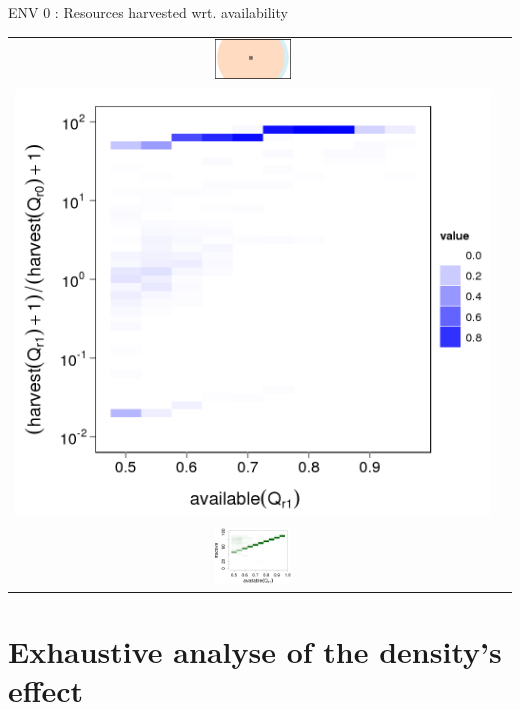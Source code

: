\documentclass[8pt, handout=show,notes=show]{beamer}
\begin{document}
\begin{frame}{ENV 0 : Resources harvested wrt. availability}

	\begin{table}[H]
		\begin{tabular}{cc}
			\includegraphics[width=2cm]{../images/5StaticEnv/environments/staticEnv0}&\\
			\includegraphics[width=\imgSize]{../images/5StaticEnv/medianRatioHM_env0}\\
\includegraphics[width=2cm]{../images/5StaticEnv/AliveHM_env0}\\

		\end{tabular}
	\end{table}
\end{frame}



\section{Exhaustive analyse of the density's effect}
\end{document}
